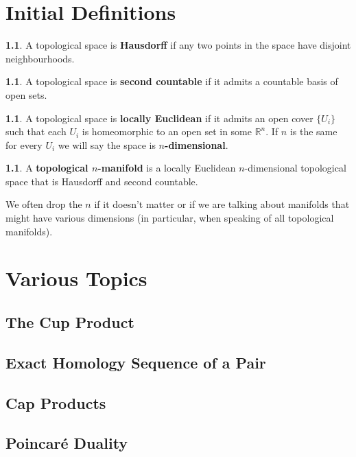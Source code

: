 \documentclass[oneside,english]{amsbook}
\numberwithin{section}{chapter}
\theoremstyle{plain}
\theoremstyle{definition}
\newtheorem{defn}[thm]{\protect\definitionname}
\providecommand{\definitionname}{Definition}
\begin{document}
	\chapter{Initial Definitions}
	
		\begin{defn} 
			A topological space is \textbf{Hausdorff} if any two points in the space have disjoint neighbourhoods.
		\end{defn}
		
		\begin{defn} 
			A topological space is \textbf{second countable} if it admits a countable basis of open sets.
		\end{defn}

		\begin{defn} 
			A topological space is \textbf{locally Euclidean} if it admits an open cover $\{U_i\}$ such that each $U_i$ is homeomorphic to an open set in some $\mathbb{R}^n$. If $n$ is the same for every $U_i$ we will say the space is \textbf{$n$-dimensional}.
		\end{defn}

		\begin{defn} 
			A \textbf{topological $n$-manifold} is a locally Euclidean $n$-dimensional topological space that is Hausdorff and second countable.  
		\end{defn}
		
		We often drop the $n$ if it doesn't matter or if we are talking about manifolds that might have various dimensions (in particular, when speaking of all topological manifolds).
	
	
	\chapter{Various Topics}
	\section{The Cup Product}
	\section{Exact Homology Sequence of a Pair}
	\section{Cap Products}
	\section{Poincar\'e Duality}
	
\end{document}
